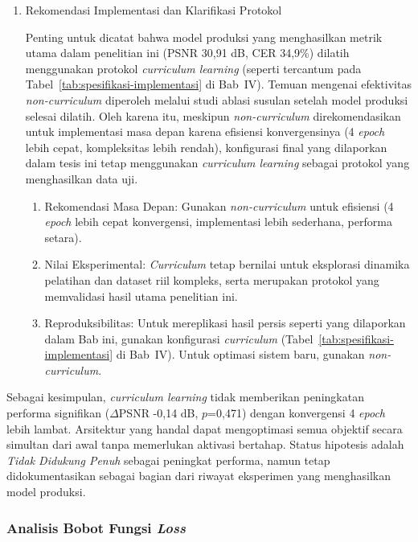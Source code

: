 \begin{enumerate}[leftmargin=1.5em, labelsep=0.5em, itemindent=0pt, label=\arabic*., topsep=0pt, partopsep=0pt]
    \item Rekomendasi Implementasi dan Klarifikasi Protokol
    
    Penting untuk dicatat bahwa model produksi yang menghasilkan metrik utama dalam penelitian ini (PSNR 30,91 dB, CER 34,9\%) dilatih menggunakan protokol \textit{curriculum learning} (seperti tercantum pada Tabel~\ref{tab:spesifikasi-implementasi} di Bab~IV). Temuan mengenai efektivitas \textit{non-curriculum} diperoleh melalui studi ablasi susulan setelah model produksi selesai dilatih. Oleh karena itu, meskipun \textit{non-curriculum} direkomendasikan untuk implementasi masa depan karena efisiensi konvergensinya (4 \textit{epoch} lebih cepat, kompleksitas lebih rendah), konfigurasi final yang dilaporkan dalam tesis ini tetap menggunakan \textit{curriculum learning} sebagai protokol yang menghasilkan data uji.

    \begin{enumerate}[leftmargin=1.5em, labelsep=0.5em, itemindent=0pt, noitemsep, topsep=0pt, label=\alph*)]
        \item Rekomendasi Masa Depan: Gunakan \textit{non-curriculum} untuk efisiensi (4 \textit{epoch} lebih cepat konvergensi, implementasi lebih sederhana, performa setara).

        \item Nilai Eksperimental: \textit{Curriculum} tetap bernilai untuk eksplorasi dinamika pelatihan dan dataset riil kompleks, serta merupakan protokol yang memvalidasi hasil utama penelitian ini.

        \item Reproduksibilitas: Untuk mereplikasi hasil persis seperti yang dilaporkan dalam Bab ini, gunakan konfigurasi \textit{curriculum} (Tabel~\ref{tab:spesifikasi-implementasi} di Bab~IV). Untuk optimasi sistem baru, gunakan \textit{non-curriculum}.
    \end{enumerate}
\end{enumerate}

Sebagai kesimpulan, \textit{curriculum learning} tidak memberikan peningkatan performa signifikan ($\Delta$PSNR -0,14 dB, $p$=0,471) dengan konvergensi 4 \textit{epoch} lebih lambat. Arsitektur yang handal dapat mengoptimasi semua objektif secara simultan dari awal tanpa memerlukan aktivasi bertahap. Status hipotesis adalah \textit{Tidak Didukung Penuh} sebagai peningkat performa, namun tetap didokumentasikan sebagai bagian dari riwayat eksperimen yang menghasilkan model produksi.

\subsubsection{Analisis Bobot Fungsi \textit{Loss}}
\label{subsubsec:optimasi-loss-weights}

